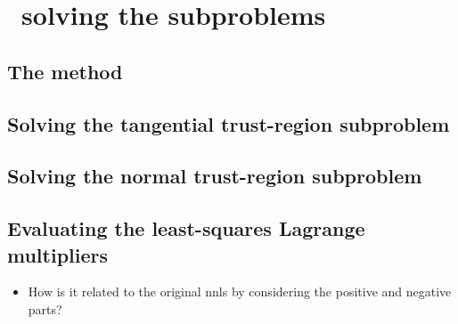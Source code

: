 %
%
%
\chapter{ \textemdash\ solving the subproblems}
\label{ch:cobyqa-subproblems}

\section{The  method}

\section{Solving the tangential trust-region subproblem}
\label{sec:cobyqa-tangential}

\section{Solving the normal trust-region subproblem}
\label{sec:cobyqa-normal}

\section{Evaluating the least-squares Lagrange multipliers}

\begin{itemize}
    \item How is it related to the original \gls{nnls} by considering the positive and negative parts?
\end{itemize}
